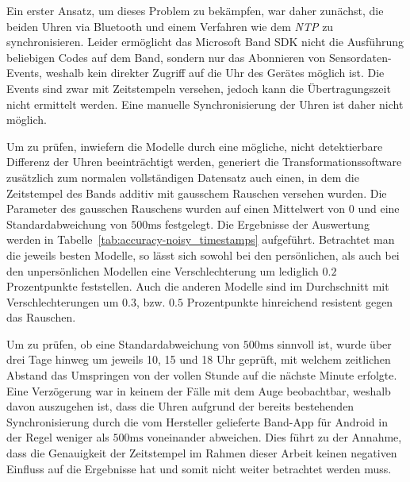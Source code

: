 Ein erster Ansatz, um dieses Problem zu bekämpfen, war daher zunächst, die beiden Uhren via Bluetooth und einem Verfahren wie dem \textit{\ac{NTP}} \cite{Mills} zu synchronisieren. Leider ermöglicht das Microsoft Band \acs{SDK} nicht die Ausführung beliebigen Codes auf dem Band, sondern nur das Abonnieren von Sensordaten-Events, weshalb kein direkter Zugriff auf die Uhr des Gerätes möglich ist. Die Events sind zwar mit Zeitstempeln versehen, jedoch kann die Übertragungszeit nicht ermittelt werden. Eine manuelle Synchronisierung der Uhren ist daher nicht möglich.

Um zu prüfen, inwiefern die Modelle durch eine mögliche, nicht detektierbare Differenz der Uhren beeinträchtigt werden, generiert die Transformationssoftware zusätzlich zum normalen vollständigen Datensatz auch einen, in dem die Zeitstempel des Bands additiv mit gausschem Rauschen versehen wurden. Die Parameter des gausschen Rauschens wurden auf einen Mittelwert von $0$ und eine Standardabweichung von $500 \text{ms}$ festgelegt. Die Ergebnisse der Auswertung werden in Tabelle~\ref{tab:accuracy-noisy_timestamps} aufgeführt. Betrachtet man die jeweils besten Modelle, so lässt sich sowohl bei den persönlichen, als auch bei den unpersönlichen Modellen eine Verschlechterung um lediglich $0.2$ Prozentpunkte feststellen. Auch die anderen Modelle sind im Durchschnitt mit Verschlechterungen um $0.3$, bzw. $0.5$ Prozentpunkte hinreichend resistent gegen das Rauschen.

Um zu prüfen, ob eine Standardabweichung von $500 \text{ms}$ sinnvoll ist, wurde über drei Tage hinweg um jeweils 10, 15 und 18 Uhr geprüft, mit welchem zeitlichen Abstand das Umspringen von der vollen Stunde auf die nächste Minute erfolgte. Eine Verzögerung war in keinem der Fälle mit dem Auge beobachtbar, weshalb davon auszugehen ist, dass die Uhren aufgrund der bereits bestehenden Synchronisierung durch die vom Hersteller gelieferte Band-App für Android in der Regel weniger als $500 \text{ms}$ voneinander abweichen. Dies führt zu der Annahme, dass die Genauigkeit der Zeitstempel im Rahmen dieser Arbeit keinen negativen Einfluss auf die Ergebnisse hat und somit nicht weiter betrachtet werden muss.

